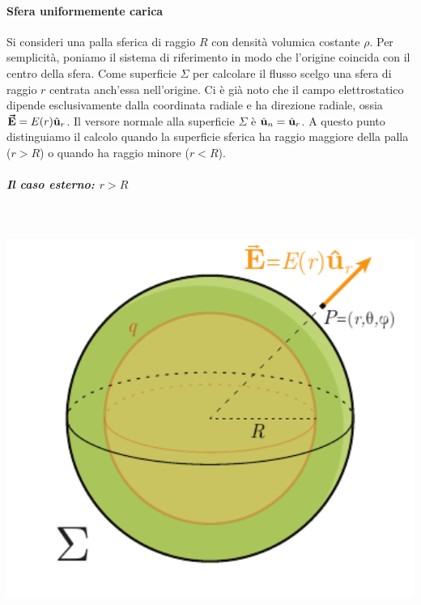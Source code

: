 \paragraph{Sfera uniformemente carica}
Si consideri una palla sferica di raggio $R$ con densità volumica costante $\rho$. Per semplicità, poniamo il sistema di riferimento in modo che l'origine coincida con il centro della sfera. Come superficie $\Sigma$ per calcolare il flusso scelgo una sfera di raggio $r$ centrata anch'essa nell'origine.
Ci è già noto che il campo elettrostatico dipende esclusivamente dalla coordinata radiale e ha direzione radiale, ossia $\vb*{\va{E}}=E(r)\hat{\mathbf{u}}_r$. Il versore normale alla superficie $\Sigma$ è $\hat{\mathbf{u}}_n=\hat{\mathbf{u}}_r$.
A questo punto distinguiamo il calcolo quando la superficie sferica ha raggio maggiore della palla ($r>R$) o quando ha raggio minore ($r<R$).
\subparagraph{Il caso esterno: $r>R$}~\\
\begin{minipage}{0.45\textwidth}
	\begin{center}
		\includegraphics[width=1\textwidth]{images/chp2sferacarica1.pdf}
	\end{center}
\end{minipage}\hspace{5pt}
